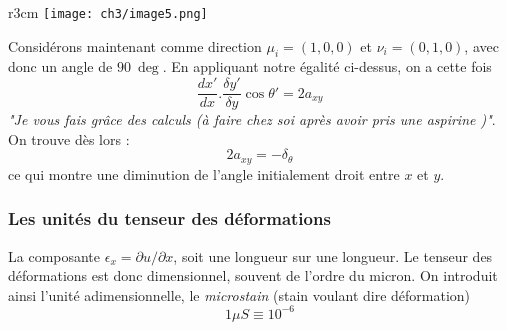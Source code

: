 \begin{wrapfigure}[9]{r}{3cm}
	\texttt{[image: ch3/image5.png]}
\end{wrapfigure}
Considérons maintenant comme direction $\mu_i = (1,0,0)$ et $\nu_i=(0,1,0)$, avec donc 
un angle de $90\ \deg$. En appliquant notre égalité ci-dessus, on a cette fois 
\begin{equation}
	\dfrac{dx'}{dx}.\dfrac{\delta y'}{\delta y}\cos\theta' = 2a_{xy}
\end{equation}
\textit{"Je vous fais grâce des calculs (à faire chez soi après avoir pris une aspirine
)"}. On trouve dès lors :
\begin{equation}
	2a_{xy} = -\delta_\theta
\end{equation}
ce qui montre une diminution de l'angle initialement droit entre $x$ et $y$. 
        
        
\subsubsection{Les unités du tenseur des déformations}
La composante $\epsilon_x = \partial u/\partial x$, soit une longueur sur une longueur.
Le tenseur des déformations est donc dimensionnel, souvent de l'ordre du micron. On 
introduit ainsi l'unité adimensionnelle, le \textit{microstain} (stain voulant dire
déformation)
\begin{equation}
	1\mu S \equiv 10^{-6}
\end{equation}
